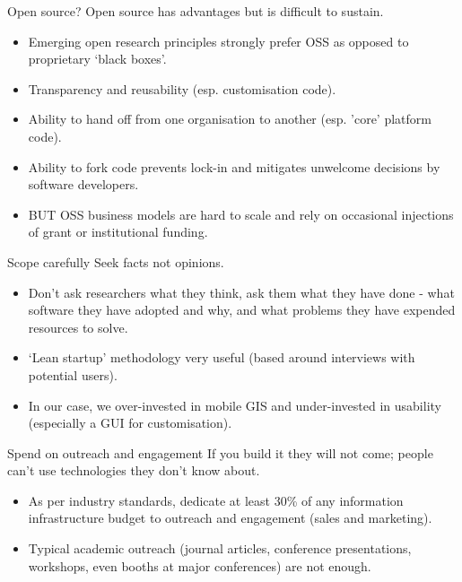 \documentclass[aspectratio=169, 12pt]{beamer} %
\begin{document}
\begin{frame}{Open source?}
   Open source has advantages but is difficult to sustain.
      \begin{itemize}
        \item Emerging open research principles strongly prefer OSS as opposed to proprietary ‘black boxes’.
        \item Transparency and reusability (esp. customisation code).
        \item Ability to hand off from one organisation to another (esp. 'core' platform code).
        \item Ability to fork code prevents lock-in and mitigates unwelcome decisions by software developers.
        \item BUT OSS business models are hard to scale and rely on occasional injections of grant or institutional funding.
    \end{itemize}
\end{frame}

\begin{frame}{Scope carefully}
   Seek facts not opinions.
      \begin{itemize}
        \item Don’t ask researchers what they think, ask them what they have done - what software they have adopted and why, and what problems they have expended resources to solve. 
        \item ‘Lean startup’ methodology very useful (based around interviews with potential users).
        \item In our case, we over-invested in mobile GIS and under-invested in usability (especially a GUI for customisation).
    \end{itemize}
\end{frame}

\begin{frame}{Spend on outreach and engagement}
   If you build it they will not come; people can't use technologies they don't know about.
      \begin{itemize}
        \item As per industry standards, dedicate at least 30\% of any information infrastructure budget to outreach and engagement (sales and marketing). 
        \item Typical academic outreach (journal articles, conference presentations, workshops, even booths at major conferences) are not enough.
    \end{itemize}
\end{frame}
\end{document}
